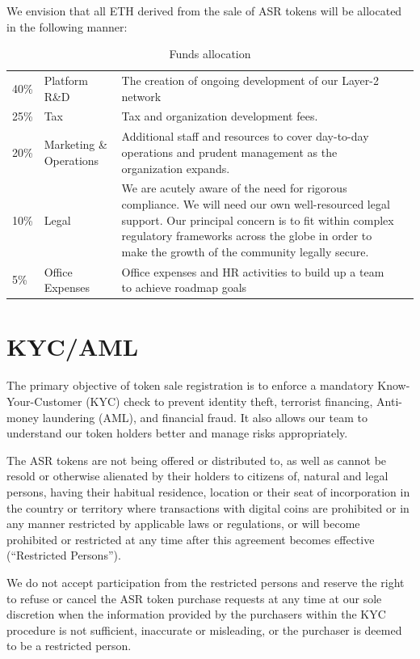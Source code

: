 We envision that all ETH derived from the sale of ASR tokens will be allocated in the following manner:
\newline\newline

\begin{table}[H]
\begin{tabular}{llp{}l}
  40\% & Platform R\&D & The creation of ongoing development of our Layer-2 network \\
  25\% & Tax & Tax and organization development fees.\\
  20\% & Marketing \& Operations & Additional staff and resources to cover day-to-day operations and prudent management as the organization expands. \\
  10\% & Legal & We are acutely aware of the need for rigorous compliance. We will need our own well-resourced legal support. Our principal concern is to fit within complex regulatory frameworks across the globe in order to make the growth of the community legally secure. \\

  5\% & Office Expenses & Office expenses and HR activities to build up
        a team to achieve roadmap goals
\end{tabular}
\caption{\label{tab:table-name}Funds allocation}
\end{table}

\section{KYC/AML}

The primary objective of token sale registration is to enforce a mandatory Know-Your-Customer (KYC) check to prevent identity theft, terrorist financing, Anti-money laundering (AML), and financial fraud. It also allows our team to understand our token holders better and manage risks appropriately.

The ASR tokens are not being offered or distributed to, as well as cannot be resold or otherwise alienated by their holders to citizens of, natural and legal persons, having their habitual residence, location or their seat of incorporation in the country or territory where transactions with digital coins are prohibited or in any manner restricted by applicable laws or regulations, or will become prohibited or restricted at any time after this agreement becomes effective (“Restricted Persons”).

We do not accept participation from the restricted persons and reserve the right to refuse or cancel the ASR token purchase requests at any time at our sole discretion when the information provided by the purchasers within the KYC procedure is not sufficient, inaccurate or misleading, or the purchaser is deemed to be a restricted person.

